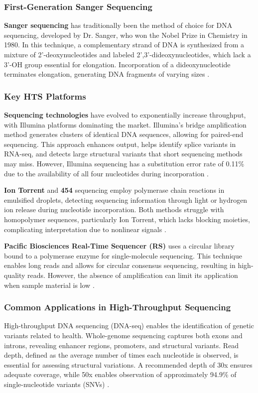 \subsubsection{First-Generation Sanger Sequencing} 
\textbf{Sanger sequencing} has traditionally been the method of choice for DNA sequencing, developed by Dr. Sanger, who won the Nobel Prize in Chemistry in 1980. In this technique, a complementary strand of DNA is synthesized from a mixture of 2'-deoxynucleotides and labeled 2',3'-dideoxynucleotides, which lack a 3'-OH group essential for elongation. Incorporation of a dideoxynucleotide terminates elongation, generating DNA fragments of varying sizes \cite*{L5-HighThroughput}.

\subsubsection{Key HTS Platforms} 
\textbf{Sequencing technologies} have evolved to exponentially increase throughput, with Illumina platforms dominating the market. Illumina's bridge amplification method generates clusters of identical DNA sequences, allowing for paired-end sequencing. This approach enhances output, helps identify splice variants in RNA-seq, and detects large structural variants that short sequencing methods may miss. However, Illumina sequencing has a substitution error rate of 0.11\% due to the availability of all four nucleotides during incorporation  \cite*{L5-HighThroughput}.

\textbf{Ion Torrent} and \textbf{454} sequencing employ polymerase chain reactions in emulsified droplets, detecting sequencing information through light or hydrogen ion release during nucleotide incorporation. Both methods struggle with homopolymer sequences, particularly Ion Torrent, which lacks blocking moieties, complicating interpretation due to nonlinear signals  \cite*{L5-HighThroughput}.

\textbf{Pacific Biosciences Real-Time Sequencer (RS)} uses a circular library bound to a polymerase enzyme for single-molecule sequencing. This technique enables long reads and allows for circular consensus sequencing, resulting in high-quality reads. However, the absence of amplification can limit its application when sample material is low  \cite*{L5-HighThroughput}.

\subsubsection{Common Applications in High-Throughput Sequencing}
High-throughput DNA sequencing (DNA-seq) enables the identification of genetic variants related to health. Whole-genome sequencing captures both exons and introns, revealing enhancer regions, promoters, and structural variants. Read depth, defined as the average number of times each nucleotide is observed, is essential for assessing structural variations. A recommended depth of 30x ensures adequate coverage, while 50x enables observation of approximately 94.9\% of single-nucleotide variants (SNVs) \cite*{L5-HighThroughput}.

